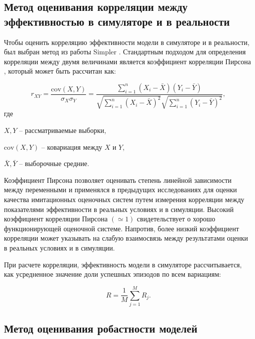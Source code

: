     \subsection{Метод оценивания корреляции между эффективностью в симуляторе и в реальности}
       
        Чтобы оценить корреляцию эффективности модели в симуляторе и в реальности, был выбран метод из работы Simpler \cite{li24simpler}. Стандартным подходом для определения корреляции между двумя величинами является коэффициент корреляции Пирсона \cite{Pearson}, который может быть рассчитан как:

        \begin{equation}
            \label{eq:Pearson}
        r_{XY} = \frac{\text{cov}(X, Y)}{\sigma_X \sigma_Y} = \frac{\sum_{i=1}^n (X_i - \bar{X})(Y_i - \bar{Y})}{\sqrt{\sum_{i=1}^n (X_i - \bar{X})^2} \sqrt{\sum_{i=1}^n (Y_i - \bar{Y})^2}},
        \end{equation}
        где
        \begin{description}
            \item $X, Y$ -- рассматриваемые выборки,
            \item $\text{cov}(X, Y)$ -- ковариация между $X$ и $Y$,
            \item $\bar{X}, \bar{Y}$ -- выборочные средние.
        \end{description}
        
        Коэффициент Пирсона позволяет оценивать степень линейной зависимости между переменными и применялся в предыдущих исследованиях для оценки качества имитационных оценочных систем \cite{Kadian_2020} путем измерения корреляции между показателями эффективности в реальных условиях и в симуляции. Высокий коэффициент корреляции Пирсона $(\simeq 1)$ свидетельствует о хорошо функционирующей оценочной системе.  Напротив, более низкий коэффициент корреляции может указывать на слабую взаимосвязь между результатами оценки в реальных условиях и в симуляции. 

        При расчете корреляции, эффективность модели в симуляторе рассчитывается, как усредненное значение доли успешных эпизодов по всем вариациям:

        \begin{equation}
            \label{eq:Ravg}
            R = \frac{1}{M} \sum_{j=1}^M R_j.
        \end{equation}

    \subsection{Метод оценивания робастности моделей}

